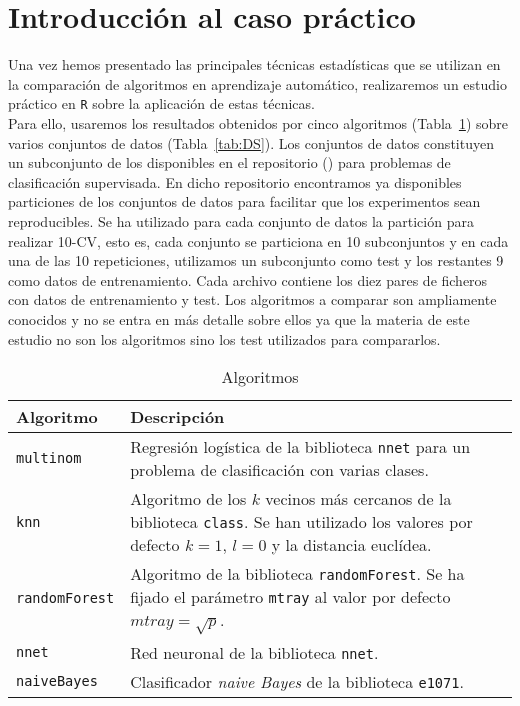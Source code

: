 \section{Introducción al caso práctico}
	Una vez hemos presentado las principales técnicas
estadísticas que se utilizan en la comparación de algoritmos
en aprendizaje automático, realizaremos un estudio práctico
en \texttt{R} sobre la aplicación de estas técnicas.\\
	Para ello, usaremos los resultados obtenidos por cinco
algoritmos (Tabla~\ref{tab:algoritmos}) 
sobre varios conjuntos de datos (Tabla~\ref{tab:DS}). Los
conjuntos de datos constituyen un subconjunto de los 
disponibles en el repositorio 
(\cite{alcala2010keel}) para problemas de clasificación
supervisada. En dicho repositorio encontramos ya disponibles
particiones de los conjuntos de datos para facilitar que los
experimentos sean reproducibles. Se ha utilizado para cada 
conjunto de datos la partición para realizar 10-CV, esto es,
cada conjunto se particiona en 10 subconjuntos y en cada una 
de las 10 repeticiones, utilizamos un subconjunto como test y
los restantes 9 como datos de entrenamiento. Cada archivo
contiene los diez pares de ficheros con datos de
entrenamiento y test. Los algoritmos a comparar son
ampliamente conocidos y no se entra en más detalle sobre
ellos ya que la materia de este estudio no son los algoritmos
sino los test utilizados para compararlos.

\begin{table}[H]
\centering
\caption{Algoritmos}
\label{tab:algoritmos}
\begin{tabularx}{\textwidth}{lX}
\toprule
Algoritmo             & Descripción                                                                                                                             \\ \midrule
\texttt{multinom}     & Regresión logística de la biblioteca \texttt{nnet} para un problema de clasificación con varias clases.                               \\
\texttt{knn}          & Algoritmo de los $k$ vecinos más cercanos de la biblioteca \texttt{class}. 
Se han utilizado los valores por defecto $k=1$, $l=0$ y la distancia euclídea.      \\
\texttt{randomForest} & Algoritmo de la biblioteca \texttt{randomForest}. Se ha fijado el parámetro \texttt{mtray} al valor por defecto $mtray = \sqrt{p}$. \\
\texttt{nnet}         & Red neuronal de la biblioteca \texttt{nnet}.                                                                                          \\
\texttt{naiveBayes}   & Clasificador \textit{naive Bayes} de la biblioteca \texttt{e1071}.                                                                  \\ \bottomrule
\end{tabularx}
\end{table}

